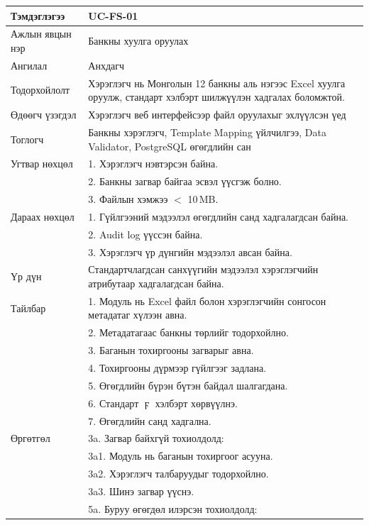 \begin{longtable}{|L{4cm}|L{\dimexpr\textwidth-4cm-3\arrayrulewidth\relax}|}
Тэмдэглэгээ & UC-FS-01 \\ \hline
Ажлын явцын нэр & Банкны хуулга оруулах \\ \hline
Ангилал & Анхдагч \\ \hline
Тодорхойлолт & Хэрэглэгч нь Монголын 12 банкны аль нэгээс Excel хуулга оруулж, стандарт хэлбэрт шилжүүлэн хадгалах боломжтой. \\ \hline
Өдөөгч үзэгдэл & Хэрэглэгч веб интерфейсээр файл оруулахыг эхлүүлсэн үед \\ \hline
Тоглогч & Банкны хэрэглэгч, Template Mapping үйлчилгээ, Data Validator, PostgreSQL өгөгдлийн сан \\ \hline
Угтвар нөхцөл & 1. Хэрэглэгч нэвтэрсэн байна.\\
               & 2. Банкны загвар байгаа эсвэл үүсгэж болно.\\
               & 3. Файлын хэмжээ $<$ 10\,MB. \\ \hline
Дараах нөхцөл & 1. Гүйлгээний мэдээлэл өгөгдлийн санд хадгалагдсан байна.\\
                & 2. Audit log үүссэн байна.\\
                & 3. Хэрэглэгч үр дүнгийн мэдээлэл авсан байна. \\ \hline
Үр дүн & Стандартчлагдсан санхүүгийн мэдээлэл хэрэглэгчийн атрибутаар хадгалагдсан байна. \\ \hline
Тайлбар & 1. Модуль нь Excel файл болон хэрэглэгчийн сонгосон метадатаг хүлээн авна.\\
              & 2. Метадатагаас банкны төрлийг тодорхойлно.\\
              & 3. Баганын тохиргооны загварыг авна.\\
              & 4. Тохиргооны дүрмээр гүйлгээг задлана.\\
              & 5. Өгөгдлийн бүрэн бүтэн байдал шалгагдана.\\
              & 6. Стандарт $\digamma$ хэлбэрт хөрвүүлнэ.\\
              & 7. Өгөгдлийн санд хадгална.\\ \hline
Өргөтгөл & 3a. Загвар байхгүй тохиолдолд: \\ 
                      & \quad 3a1. Модуль нь баганын тохиргоог асууна. \\ 
                      & \quad 3a2. Хэрэглэгч талбаруудыг тодорхойлно. \\ 
                      & \quad 3a3. Шинэ загвар үүснэ. \\ 
                      & 5a. Буруу өгөгдөл илэрсэн тохиолдолд: \\ 

\end{longtable}
